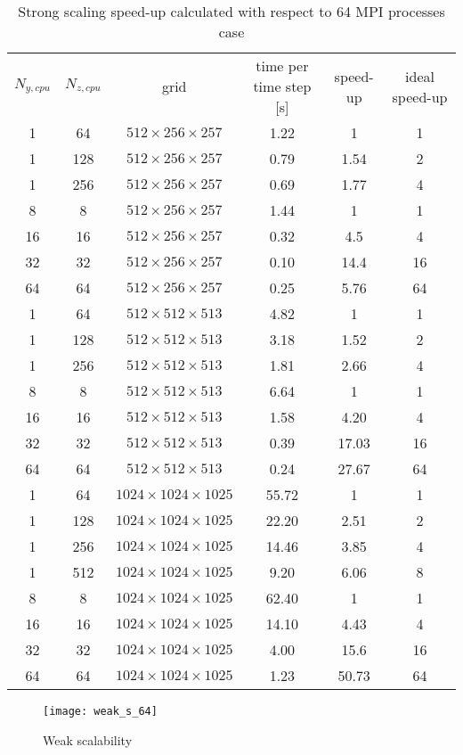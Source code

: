 \begin{table}[H]
\centering
\caption{Strong scaling speed-up calculated with respect to 64 MPI processes case}
\begin{tabular}{c|c|c|c|c|c}
$N_{y,cpu}$ & $N_{z,cpu}$ & grid & time per time step [s] & speed-up &ideal speed-up\\[1.5ex]
1 & 64 & $512\times256\times257$&1.22 & 1& 1\\
1 & 128 & $512\times256\times257$& 0.79 &1.54& 2\\
1 &256& $512\times256\times257$& 0.69 & 1.77 &4\\
\hline
8& 8& $512\times256\times257$& 1.44  & 1 &1\\
16& 16 & $512\times256\times257$& 0.32 & 4.5& 4 \\
32 &32 & $512\times256\times257$& 0.10 & 14.4 &16 \\
64 &64 & $512\times256\times257$& 0.25 & 5.76 &64\\
\hline\hline
1& 64 & $512\times512\times513$& 4.82  & 1 &1\\
1& 128& $512\times512\times513$& 3.18  & 1.52 &2 \\
1 &256& $512\times512\times513$& 1.81 & 2.66 &4\\
\hline
8& 8 & $512\times512\times513$& 6.64 &  1 &1\\
16& 16 & $512\times512\times513$&1.58 & 4.20 &4\\
32 &32 & $512\times512\times513$&0.39& 17.03 &16\\
64 &64 & $512\times512\times513$&0.24 &  27.67 &64\\
\hline\hline
1& 64 & $1024\times1024\times1025$& 55.72 &1  &1 \\
1& 128& $1024\times1024\times1025$& 22.20 & 2.51 &2\\
1 &256& $1024\times1024\times1025$& 14.46 &3.85 &4\\
1 &512 & $1024\times1024\times1025$&9.20 & 6.06 &8\\
\hline
8& 8 & $1024\times1024\times1025$&62.40 & 1 &1\\
16& 16& $1024\times1024\times1025$& 14.10 & 4.43 &4\\
32 &32& $1024\times1024\times1025$& 4.00 &  15.6 &16\\
64 &64& $1024\times1024\times1025$& 1.23 & 50.73  &64\\
\end{tabular}
\end{table}
\begin{figure}[h!]
\centering
\texttt{[image: weak\_s\_64]}
\caption{Weak scalability}
\end{figure}
